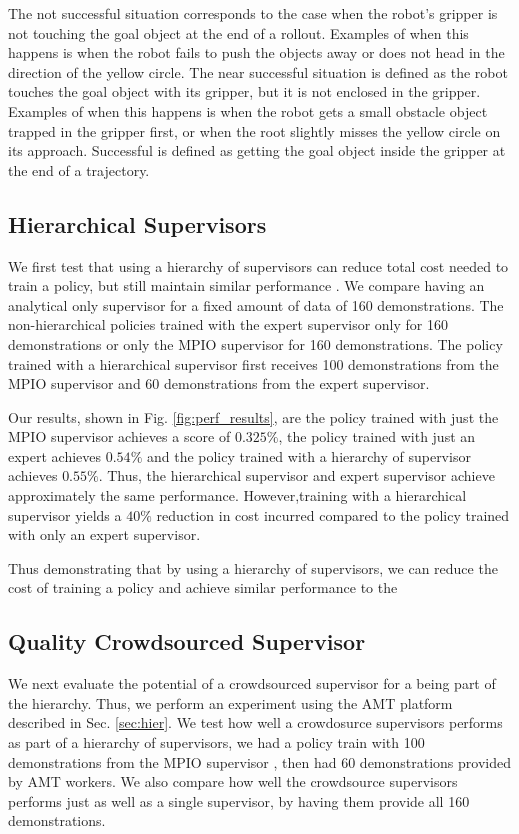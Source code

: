 \documentclass[10pt, conference]{ieeeconf}      %
\begin{document}
The not successful situation corresponds to the case when the robot's gripper is not touching the goal object at the end of a rollout. Examples of when this happens is when the robot fails to push the objects away or does not head in the direction of the yellow circle. The near successful situation is defined as the robot touches the goal object with its gripper, but it is not enclosed in the gripper. Examples of when this happens is when the robot gets a small obstacle object trapped in the gripper first, or when the root slightly misses the yellow circle on its approach. Successful is defined as getting the goal object inside the gripper at the end of a trajectory. 


\subsection{Hierarchical Supervisors}
We first test  that using a hierarchy of supervisors can reduce total cost needed to train a policy, but still maintain similar performance .  We compare having an analytical only supervisor for a fixed amount of data of 160 demonstrations. The non-hierarchical policies trained with the expert supervisor only for 160 demonstrations or only the MPIO supervisor for 160 demonstrations.  The policy trained with a hierarchical supervisor first receives  100 demonstrations from the MPIO supervisor and  60 demonstrations from the expert supervisor. 

Our results, shown in Fig. \ref{fig:perf_results}, are the policy trained with just the MPIO supervisor achieves a score of $0.325\%$, the policy trained with just an expert achieves $0.54\%$ and the policy trained with a hierarchy of supervisor achieves $0.55\%$.  Thus, the hierarchical supervisor and expert supervisor achieve approximately the same performance. However,training with a hierarchical supervisor yields a $40\%$ reduction in cost incurred compared to the policy trained with only an expert supervisor. 


Thus demonstrating that by using a hierarchy of supervisors, we can reduce the cost of training a policy and achieve similar performance to the 



\subsection{Quality Crowdsourced Supervisor}
We next evaluate the potential of a  crowdsourced supervisor for a being part of the hierarchy. Thus, we perform an experiment using the AMT platform described in Sec. \ref{sec:hier}. We  test how well a crowdosurce supervisors performs as part of a hierarchy of supervisors, we had a policy train with 100  demonstrations  from the MPIO supervisor , then had 60 demonstrations provided by AMT workers. We also compare how well the crowdsource supervisors performs just as well as a single supervisor,  by having them provide all 160 demonstrations. 
\end{document}
